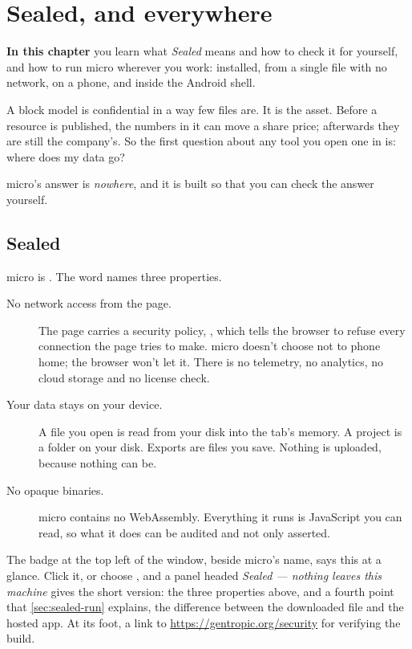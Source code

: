 \chapter{Sealed, and everywhere}\label{ch:sealed}
\begin{goals}
\textbf{In this chapter} you learn what \emph{Sealed} means and how to check it for yourself, and how to run micro wherever you work: installed, from a single file with no network, on a phone, and inside the Android shell.
\end{goals}

A block model is confidential in a way few files are. It is the asset. Before a resource is published, the numbers in it can move a share price; afterwards they are still the company's. So the first question about any tool you open one in is: where does my data go?

micro's answer is \emph{nowhere}, and it is built so that you can check the answer yourself.

\section{Sealed}\label{sec:sealed-what}
micro is . The word names three properties.

\begin{description}
\item[No network access from the page.] The page carries a security policy, , which tells the browser to refuse every connection the page tries to make. micro doesn't choose not to phone home; the browser won't let it. There is no telemetry, no analytics, no cloud storage and no license check.
\item[Your data stays on your device.] A file you open is read from your disk into the tab's memory. A project is a folder on your disk. Exports are files you save. Nothing is uploaded, because nothing can be.
\item[No opaque binaries.] micro contains no WebAssembly. Everything it runs is JavaScript you can read, so what it does can be audited and not only asserted.
\end{description}

The  badge at the top left of the window, beside micro's name, says this at a glance. Click it, or choose , and a panel headed \emph{Sealed — nothing leaves this machine} gives the short version: the three properties above, and a fourth point that \cref{sec:sealed-run} explains, the difference between the downloaded file and the hosted app. At its foot, a link to \url{https://gentropic.org/security} for verifying the build.

